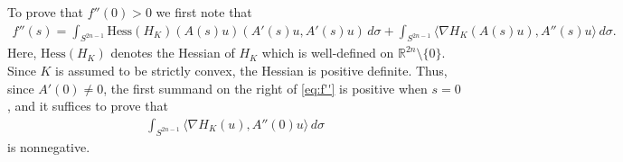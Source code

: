 \documentclass[12pt]{amsart}
\theoremstyle{definition}
\newcommand{\RR}{{\mathbb R}}
\begin{document}

To prove that $f''(0)>0$ we first note that  
\begin{align}\label{eq:f''}
    f''(s) = \int_{S^{2n-1}} \text{Hess}(H_K)(A(s)u)(A'(s)u, A'(s)u) \, d\sigma + \int_{S^{2n-1}} \langle \nabla H_K(A(s)u), A''(s)u \rangle \,d\sigma. 
\end{align}
Here, $\text{Hess}(H_K)$ denotes the Hessian of $H_K$ which is well-defined on $\RR^{2n} \setminus\{0\}$. Since $K$ is assumed to be strictly convex, the Hessian is positive definite. Thus,  since $A'(0) \neq 0$, the first summand on the right of \eqref{eq:f''} is positive when $s=0$, and it  suffices to prove that 
\begin{align*}
\int_{S^{2n-1}} \langle \nabla H_K(u), A''(0)u \rangle \,d\sigma
\end{align*}
is nonnegative.
\end{document}
